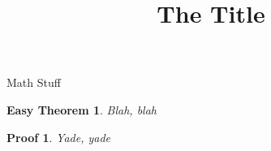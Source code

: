 \documentclass{beamer}
\title{The Title}
\newtheorem{thm}{Easy Theorem}
\newtheorem{pf}{Proof}
\begin{document}
\begin{frame}{Math Stuff}
\begin{thm}
  Blah, blah
\end{thm}
\pause
\begin{pf}
  Yade, yade
\end{pf}
\end{frame}
\end{document}
